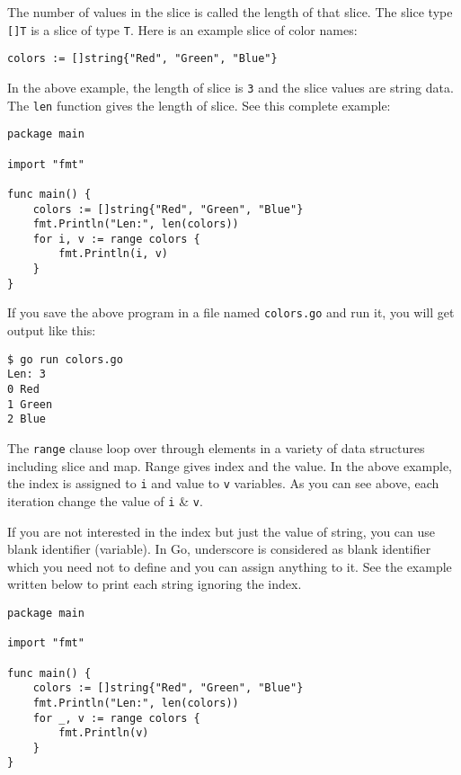 The number of values in the slice is called the length of that slice.
The slice type \texttt{[]T} is a slice of type \texttt{T}.  Here is an
example slice of color names:

\begin{lstlisting}[numbers=none]
colors := []string{"Red", "Green", "Blue"}
\end{lstlisting}

In the above example, the length of slice is \texttt{3} and the slice
values are string data.  The \texttt{len} function gives the length of
slice.  See this complete example:

\begin{lstlisting}[caption=Printing slice values]
package main

import "fmt"

func main() {
    colors := []string{"Red", "Green", "Blue"}
    fmt.Println("Len:", len(colors))
    for i, v := range colors {
        fmt.Println(i, v)
    }
}
\end{lstlisting}

If you save the above program in a file named \texttt{colors.go} and
run it, you will get output like this:

\begin{lstlisting}[numbers=none]
$ go run colors.go
Len: 3
0 Red
1 Green
2 Blue
\end{lstlisting}

The \texttt{range} clause loop over through elements in a
variety of data structures including slice and map.  Range gives index
and the value.  In the above example, the index is assigned
to \texttt{i} and value to \texttt{v} variables.  As you can see
above, each iteration change the value of \texttt{i} \& \texttt{v}.

If you are not interested in the index but just the value of string,
you can use blank identifier (variable).  In Go, underscore is
considered as blank identifier which you need not to define and you can
assign anything to it.  See the example written below to print each
string ignoring the index.

\begin{lstlisting}[caption=Range loop with index ignored]
package main

import "fmt"

func main() {
    colors := []string{"Red", "Green", "Blue"}
    fmt.Println("Len:", len(colors))
    for _, v := range colors {
        fmt.Println(v)
    }
}
\end{lstlisting}

